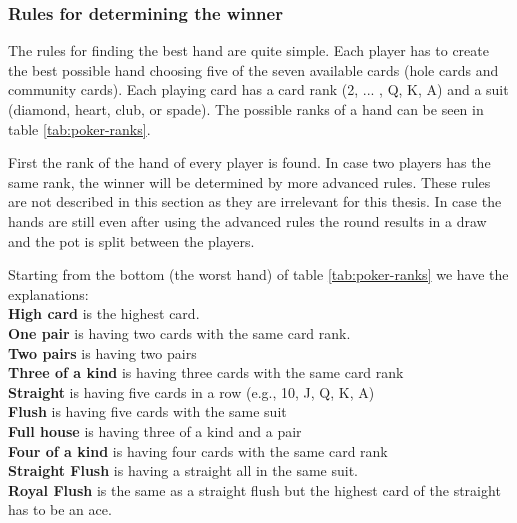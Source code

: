 \subsubsection*{Rules for determining the winner}
The rules for finding the best hand are quite simple. Each player has to create the best possible hand choosing five of the seven available cards (hole cards and community cards). Each playing card has a card rank (2, ... , Q, K, A) and a suit (diamond, heart, club, or spade). The possible ranks of a hand can be seen in table \ref{tab:poker-ranks}. 

First the rank of the hand of every player is found. In case two players has the same rank, the winner will be determined by more advanced rules. These rules are not described in this section as they are irrelevant for this thesis. In case the hands are still even after using the advanced rules the round results in a draw and the pot is split between the players.

Starting from the bottom (the worst hand) of table \ref{tab:poker-ranks} we have the explanations:\\
\textbf{High card} is the highest card.  \\
\textbf{One pair} is having two cards with the same card rank. \\
\textbf{Two pairs} is having two pairs\\
\textbf{Three of a kind} is having three cards with the same card rank \\
\textbf{Straight} is having five cards in a row (e.g., 10, J, Q, K, A)\\
\textbf{Flush} is having five cards with the same suit\\
\textbf{Full house} is having three of a kind and a pair\\
\textbf{Four of a kind} is having four cards with the same card rank \\
\textbf{Straight Flush} is having a straight all in the same suit.\\
\textbf{Royal Flush} is the same as a straight flush but the highest card of the straight has to be an ace.\\

